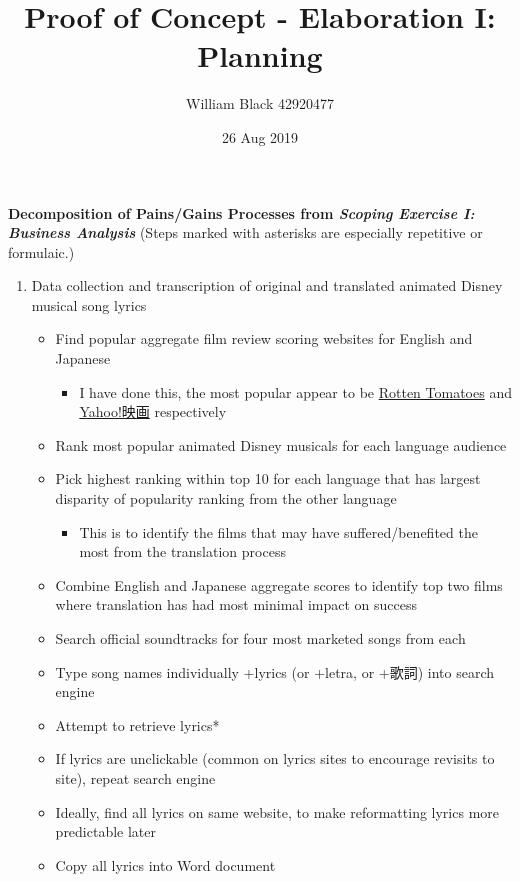 \documentclass[12pt]{article}
\title{\textbf{Proof of Concept - Elaboration I: \newline Planning}}
\date{26 Aug 2019}
\author{William Black 42920477}
\begin{document}
 
\maketitle \textbf{\small{Decomposition of Pains/Gains Processes from \textit{Scoping Exercise I: Business Analysis}}}
(Steps marked with asterisks are especially repetitive or formulaic.)
\begin{enumerate}
    \item Data collection and transcription of original and translated animated Disney musical song lyrics
    \begin{itemize}
        \item Find popular aggregate film review scoring websites for English and Japanese 
        \begin{itemize}
            \item I have done this, the most popular appear to be \href{https://rottentomatoes.com/}{Rotten Tomatoes} and \\\href{https://movies.yahoo.co.jp}{Yahoo!映画} respectively
        \end{itemize}
        \item Rank most popular animated Disney musicals for each language audience
        \item Pick highest ranking within top 10 for each language that has largest disparity of popularity ranking from the other language
        \begin{itemize}
            \item This is to identify the films that may have suffered/benefited the most from the translation process
        \end{itemize}
        \item Combine English and Japanese aggregate scores to identify top two films where translation has had most minimal impact on success
        \item Search official soundtracks for four most marketed songs from each
        \item Type song names individually +lyrics (or +letra, or +歌詞) into search engine
        \item Attempt to retrieve lyrics*
        \item If lyrics are unclickable (common on lyrics sites to encourage revisits to site), repeat search engine
        \item Ideally, find all lyrics on same website, to make reformatting lyrics more predictable later
        \item Copy all lyrics into Word document

\end{itemize}
\end{enumerate}
\end{document}
